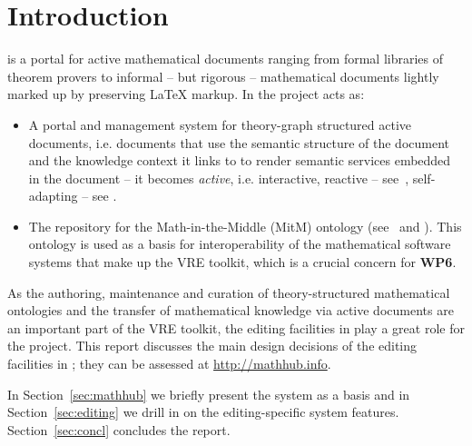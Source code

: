 \section{Introduction}\label{sec:intro}

\sys is a portal for active mathematical documents ranging from formal libraries of
theorem provers to informal -- but rigorous -- mathematical documents lightly marked up by
preserving {\LaTeX} markup. In the \pn project \sys acts as: 
\begin{itemize}
\item A portal and management system for theory-graph structured active documents,
  i.e. documents that use the semantic structure of the document and the knowledge context
  it links to to render semantic services embedded in the document -- it becomes
  \emph{active}, i.e. interactive, reactive -- see~\cite{ODK-D4.3}, self-adapting --
  see .
\item The repository for the Math-in-the-Middle (MitM) ontology
  (see~\cite{DehKohKon:iop16} and ). This ontology is used as a basis for
  interoperability of the mathematical software systems that make up the \pn VRE toolkit,
  which is a crucial concern for \textbf{WP6}.
\end{itemize}
As the authoring, maintenance and curation of theory-structured mathematical ontologies
and the transfer of mathematical knowledge via active documents are an important part of
the \pn VRE toolkit, the editing facilities in \sys play a great role for the
project. This report discusses the main design decisions of the editing facilities in
\sys; they can be assessed at \url{http://mathhub.info}.

In Section~\ref{sec:mathhub} we briefly present the \sys system as a basis and in
Section~\ref{sec:editing} we drill in on the editing-specific system
features. Section~\ref{sec:concl} concludes the report. 


